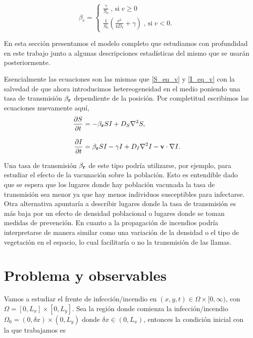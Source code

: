 \begin{equation}
  \beta_c = 
  \begin{cases}
    \frac{\gamma}{S_0} \; \text{, si} \; v\geq 0 \\
    \frac{1}{S_0}(\frac{v^2}{4D_I}+\gamma) \; \text{, si} \; v<0.
  \end{cases}
  \label{eq:beta_c_v}
\end{equation}



En esta sección presentamos el modelo completo que estudiamos con profundidad en este trabajo junto a algunas descripciones estadísticas del mismo que se usarán 
posteriormente. 

Esencialmente las ecuaciones son las mismas que \ref{S_eq_v} y \ref{I_eq_v} con la salvedad de que ahora introducimos hetereogeneidad en el medio poniendo 
una tasa de transmisión $\beta_{\vb{r}}$ dependiente de la posición. Por completitud escribimos las ecuaciones nuevamente aquí,
\begin{align}
  \pdv{S}{t}&=-\beta_{\vb{r}} SI + D_{S} \laplacian{S}  ,\label{Seqfinal}\\[.3cm]
  \pdv{I}{t}&=\beta_{\vb{r}} SI - \gamma I + D_{I} \laplacian{I} - \mathbf{v} \cdot \nabla I.\label{Ieqfinal}
\end{align}

Una tasa de transmisión $\beta_{\vb{r}}$ de este tipo podría utilizarse, por ejemplo, para estudiar el efecto de la vacunación sobre la población. Esto es 
entendible dado que se espera que los lugares donde hay población vacunada la tasa de transmisión sea menor ya que hay menos individuos susceptibles para
infectarse. Otra alternativa apuntaría a describir lugares donde la tasa de transmisión es más baja por un efecto de densidad poblacional o lugares donde se toman medidas de prevención. 
En cuanto a la propagación de incendios podría interpretarse de manera similar como una variación de la densidad o el tipo de vegetación en el espacio, lo cual 
facilitaría o no la transmisión de las llamas.

\section{Problema y observables}
\label{Problema}

Vamos a estudiar el frente de infección/incendio en $(x,y,t) \in \Omega \times [0,\infty)$, con $\Omega = [0,L_x] \times [0,L_y]$. Sea la región donde 
comienza la infección/incendio $\Omega_0 = (0,\delta x) \times (0,L_y)$ donde $\delta x \in (0,L_x)$, entonces la condición inicial con la que trabajamos es

